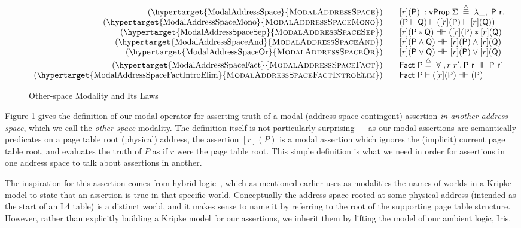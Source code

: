 \documentclass[acmsmall,screen,nonacm]{acmart}
\renewcommand{\TirNameStyle}[1]{\hypertarget{#1}{\textsc{#1}}}
\begin{document}
%

%
%
%

%
\begin{figure}
\[
  \begin{array}{r@{\qquad}l}
    \hbox{(\TirNameStyle{ModalAddressSpace})} &
         [r](\mathsf{P}) \;: \mathsf{vProp} \; \Sigma \; \stackrel{\triangle}{=} \; \lambda \_,\; \mathsf{P}~\mathsf{r}.\\
    \hbox{(\TirNameStyle{ModalAddressSpaceMono})} & (\textsf{P} \vdash \textsf{Q}) \vdash  ([r](\textsf{P}) \vdash  [r](\textsf{Q}))\\
    \hbox{(\TirNameStyle{ModalAddressSpaceSep})} & [r](\textsf{P} \ast \textsf{Q}) \dashv\vdash ([r](\textsf{P}) \ast [r](\textsf{Q})\\
    \hbox{(\TirNameStyle{ModalAddressSpaceAnd})} &   [r](\textsf{P}\land \textsf{Q}) \dashv\vdash [r](\textsf{P})\land [r](\textsf{Q})\\    
    \hbox{(\TirNameStyle{ModalAddressSpaceOr})} &    [r](\textsf{P}\lor \textsf{Q}) \dashv\vdash [r](\textsf{P})\lor [r](\textsf{Q})\\   
    \hbox{(\TirNameStyle{ModalAddressSpaceFact})} &  \textsf{Fact P} \stackrel{\triangle}{=} \;\forall \; ,r \; r' \ldotp  \textsf{P r} \dashv\vdash \textsf{P r'}\\
    \hbox{(\TirNameStyle{ModalAddressSpaceFactIntroElim})} 
    &\textsf{Fact P} \vdash  ([r](\textsf{P}) \dashv\vdash (\textsf{P}) %
  \end{array}
  \]
  \caption{Other-space Modality and Its Laws}
  \label{fig:modaldef}
  \end{figure}
Figure \ref{fig:modaldef} gives the definition of our modal operator for asserting truth of a modal
(address-space-contingent) assertion \emph{in another address space}, which we call
the \emph{other-space} modality. The definition itself is not
particularly surprising --- as our modal assertions are semantically predicates on a page table root (physical)
address, the assertion $[r](P)$ is a modal assertion which ignores the (implicit) current page table root,
and evaluates the truth of $P$ as if $r$ were the page table root. This simple definition is 
what we need in order for assertions in one address space to talk about assertions in another.

The inspiration for this assertion comes from hybrid logic~\cite{blackburn1995hybrid,areces2001hybrid,goranko1996hierarchies,gargov1993modal},
which as mentioned earlier uses as modalities the names of worlds in a Kripke model to state
that an assertion is true in that specific world.
Conceptually the address space rooted at some physical address (intended as the start of an L4 table)
is a distinct world, and it makes sense to name it by referring to the root of the
supporting page table structure. However, rather than explicitly building a Kripke model for our
assertions, we inherit them by lifting the model of our ambient logic, Iris.
\end{document}

